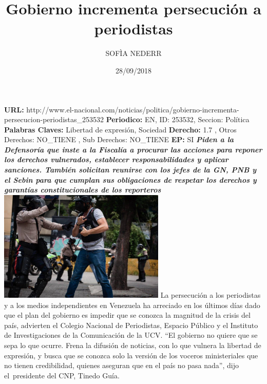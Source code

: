 \documentclass{article}%
\title{\textbf{Gobierno incrementa persecución a periodistas}}%
\author{SOFÌA NEDERR}%
\date{28/09/2018}%
\begin{document}
%
\normalsize%
\maketitle%
\textbf{URL: }%
http://www.el{-}nacional.com/noticias/politica/gobierno{-}incrementa{-}persecucion{-}periodistas\_253532\newline%
%
\textbf{Periodico: }%
EN, %
ID: %
253532, %
Seccion: %
Política\newline%
%
\textbf{Palabras Claves: }%
Libertad de expresión, Sociedad\newline%
%
\textbf{Derecho: }%
1.7%
, Otros Derechos: %
NO\_TIENE%
, Sub Derechos: %
NO\_TIENE%
\newline%
%
\textbf{EP: }%
SI\newline%
\newline%
%
\textbf{\textit{Piden a la Defensoría que inste a la Fiscalía a procurar las acciones para reponer los derechos vulnerados, establecer responsabilidades y aplicar sanciones. También solicitan reunirse con los jefes de la GN, PNB y el Sebin para que cumplan sus obligaciones de respetar los derechos y garantías constitucionales de los reporteros~}}%
\newline%
\newline%
%
\includegraphics[width=300px]{26.jpg}%
\newline%
%
La persecución a los periodistas y a los medios independientes en Venezuela ha arreciado en los últimos días dado que el plan del gobierno es impedir que se conozca la magnitud de la crisis del país, advierten el Colegio Nacional de Periodistas, Espacio Público y el Instituto de Investigaciones de la Comunicación de la UCV.%
\newline%
%
“El gobierno no quiere que se sepa lo que ocurre. Frena la difusión de noticias, con lo que vulnera la libertad de expresión, y busca que se conozca solo la versión de los voceros ministeriales que no tienen credibilidad, quienes aseguran que en el país no pasa nada”, dijo el~presidente del CNP, Tinedo Guía.%
\end{document}
